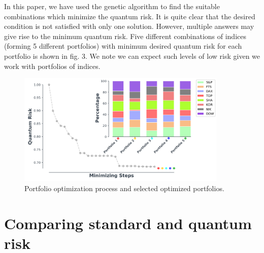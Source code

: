 \documentclass[journal,article,submit,moreauthors,pdftex]{Definitions/mdpi}
\begin{document}
In this paper, we have used the genetic algorithm to find the suitable
combinations which minimize the quantum risk. It is quite clear that the
desired condition is not satisfied with only one solution. However, multiple
answers may give rise to the minimum quantum risk. Five different
combinations of indices (forming 5 different portfolios) with minimum
desired quantum risk for each portfolio is shown in fig. 3. We note we can
expect such levels of low risk given we work with portfolios of indices.  
\begin{figure}[tbh]
	\centering
	\includegraphics[width=100mm]{fig6pr.png}
	\caption{Portfolio optimization process and selected optimized portfolios.}
	\label{fig:3}
\end{figure}
\newline
\newpage 

\section{Comparing standard and quantum risk}
\end{document}
